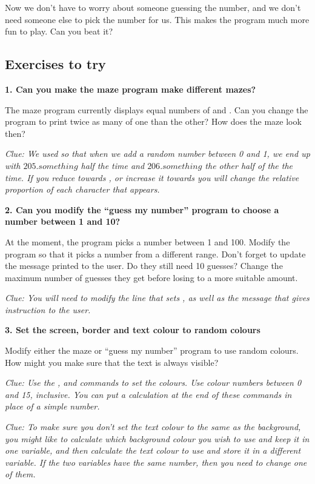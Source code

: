 Now we don't have to worry about someone guessing the number, and we
don't need someone else to pick the number for us. This makes the
program much more fun to play.  Can you beat it?


\subsection{Exercises to try}

{\bf 1. Can you make the maze program make different mazes?}

The maze program currently displays equal numbers of {}
and {}. Can you change the program to print twice as
many of one than the other?  How does the maze look then?

{\em Clue: We used  so that when we add a random number
  between 0 and 1, we end up with $205.something$ half the time and
  $206.something$ the other half of the the time.  If you reduce
   towards , or increase it towards  you
  will change the relative proportion of each character that appears.}

{\bf 2. Can you modify the ``guess my number'' program to choose a
  number between 1 and 10?}

At the moment, the program picks a number between 1 and 100.  Modify
the program so that it picks a number from a different range. Don't
forget to update the message printed to the user.  Do they still need
10 guesses? Change the maximum number of guesses they get before
losing to a more suitable amount.

{\em Clue: You will need to modify the line that sets , as
  well as the  message that gives instruction to the user.}

{\bf 3. Set the screen, border and text colour to random colours}

Modify either the maze or ``guess my number'' program to use
random colours.  How might you make sure that the text is always
visible?

{\em Clue: Use the ,  and 
  commands to set the colours. Use colour numbers between 0 and 15,
  inclusive.
  You can put a calculation at the end of
  these commands in place of a simple number.}

{\em Clue: To make sure you don't set the text colour to the same as
  the background, you might like to calculate which background colour
  you wish to use and keep it in one variable, and then calculate the
  text colour to use and store it in a different variable. If the two
  variables have the same number, then you need to change one of
  them.}

